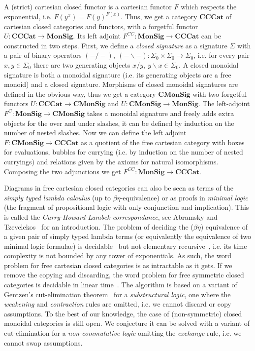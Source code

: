 A (strict) cartesian closed functor is a cartesian functor $F$ which respects the exponential, i.e. $F(y^x) = F(y)^{F(x)}$.
Thus, we get a category $\mathbf{CCCat}$ of cartesian closed categories and functors, with a forgetful functor $U : \mathbf{CCCat} \to \mathbf{MonSig}$.
Its left adjoint $F^{CC} : \mathbf{MonSig} \to \mathbf{CCCat}$ can be constructed in two steps.
First, we define a \emph{closed signature} as a signature $\Sigma$ with a pair of binary operators $(- / -), \ (- \backslash -) : \Sigma_0 \times \Sigma_0 \to \Sigma_0$, i.e. for every pair $x, y \in \Sigma_0$ there are two generating objects $x / y, \ y \backslash x \in \Sigma_0$.
A closed monoidal signature is both a monoidal signature (i.e. its generating objects are a free monoid) and a closed signature.
Morphisms of closed monoidal signatures are defined in the obvious way, thus we get a category $\mathbf{CMonSig}$ with two forgetful functors $U : \mathbf{CCCat} \to \mathbf{CMonSig}$ and $U : \mathbf{CMonSig} \to \mathbf{MonSig}$.
The left-adjoint $F^C : \mathbf{MonSig} \to \mathbf{CMonSig}$ takes a monoidal signature and freely adds extra objects for the over and under slashes, it can be defined by induction on the number of nested slashes.
Now we can define the left adjoint $F : \mathbf{CMonSig} \to \mathbf{CCCat}$ as a quotient of the free cartesian category with boxes for evaluations, bubbles for currying (i.e. by induction on the number of nested curryings) and relations given by the axioms for natural isomorphisms.
Composing the two adjunctions we get $F^{CC} : \mathbf{MonSig} \to \mathbf{CCCat}$.

Diagrams in free cartesian closed categories can also be seen as terms of the \emph{simply typed lambda calculus} (up to $\beta\eta$-equivalence) or as proofs in \emph{minimal logic} (the fragment of propositional logic with only conjunction and implication).
This is called the \emph{Curry-Howard-Lambek correspondance}, see Abramsky and Tzevelekos~\cite{AbramskyTzevelekos10} for an introduction.
The problem of deciding the ($\beta\eta$) equivalence of a given pair of simply typed lambda terms (or equivalently the equivalence of two minimal logic formulae) is decidable~\cite{Tait67} but not elementary recursive~\cite{Statman79}, i.e. its time complexity is not bounded by any tower of exponentials.
As such, the word problem for free cartesian closed categories is as intractable as it gets.
If we remove the copying and discarding, the word problem for free symmetric closed categories is decidable in linear time~\cite{Voreadou77}.
The algorithm is based on a variant of Gentzen's cut-elimination theorem~\cite{Gentzen35} for a \emph{substructural logic}, one where the \emph{weakening} and \emph{contraction} rules are omitted, i.e. we cannot discard or copy assumptions.
To the best of our knowledge, the case of (non-symmetric) closed monoidal categories is still open.
We conjecture it can be solved with a variant of cut-elimination for a \emph{non-commutative logic} omitting the \emph{exchange} rule, i.e. we cannot swap assumptions.

